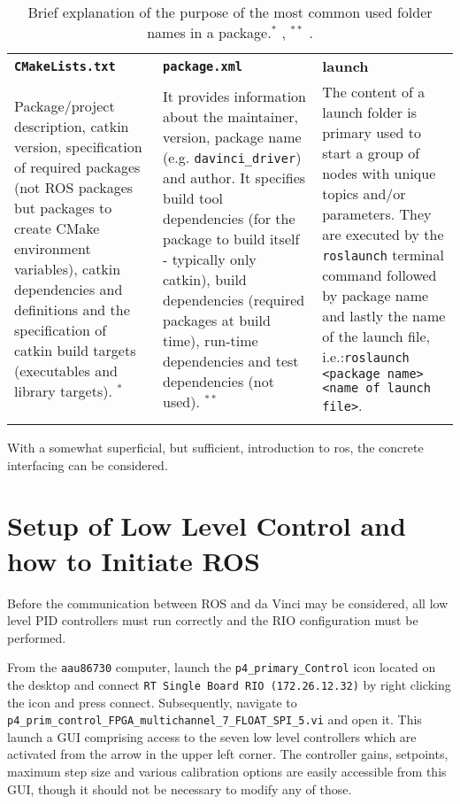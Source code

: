 \begin{table}[H]
\begin{tabularx}{\textwidth}{X X X}
\rowcolor{HeaderBlue} 
 \textbf{\texttt{CMakeLists.txt}} & \textbf{\texttt{package.xml}}& \textbf{launch} \\
Package/project description, \gls{catkin} version, specification of required packages (not ROS packages but packages to create CMake environment variables), catkin dependencies and definitions and the specification of catkin build targets (executables and library targets). 
$^*$  & It provides information about the maintainer, version, package name (e.g. \texttt{davinci\_driver}) and author. It specifies build tool dependencies (for the package to build itself - typically only catkin), build dependencies (required packages at build time), run-time dependencies and test dependencies (not used).  $^{**}$ & The content of a launch folder is primary used to start a group of nodes with unique topics and/or parameters. They are executed by the \texttt{roslaunch} terminal command followed by package name and lastly the name of the launch file, i.e.:\newline \texttt{roslaunch <package name> <name of launch file>}. \\  \rowcolor{textBlue}
\end{tabularx}
	\caption{Brief explanation of the purpose of the most common used folder names in a package.\newline $^*$ \citep{bib:CmakeLists}, $^{**}$ \citep{bib:package}.} 
\label{tab:eleb}
\end{table}
\vspace{-0.2cm}
With a somewhat superficial, but sufficient, introduction to \gls{ros}, the concrete interfacing can be considered.
\vspace{-0.4cm}
\section{Setup of Low Level Control and how to Initiate ROS}\label{sec:init_ROS}
\vspace{-0.2cm}
Before the communication between ROS and da Vinci may be considered, all low level PID controllers must run correctly and the RIO configuration must be performed. 

From the \texttt{aau86730} computer, launch the \texttt{p4\_primary\_Control} icon located on the desktop and connect \texttt{RT Single Board RIO (172.26.12.32)} by right clicking the icon and press connect. Subsequently, navigate to \texttt{p4\_prim\_control\_FPGA\_multichannel\_7\_FLOAT\_SPI\_5.vi} and open it. This launch a GUI comprising access to the seven low level controllers which are activated from the arrow in the upper left corner. The controller gains, setpoints, maximum step size and various calibration options are easily accessible from this GUI, though it should not be necessary to modify any of those. 


